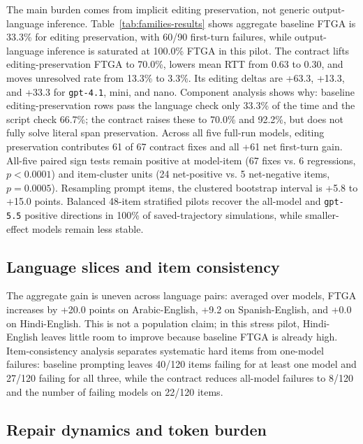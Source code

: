 The main burden comes from implicit editing preservation, not generic
output-language inference. Table~\ref{tab:families-results} shows aggregate
baseline FTGA is 33.3\% for editing preservation, with 60/90 first-turn
failures, while output-language inference is saturated at 100.0\% FTGA in this
pilot. The contract lifts editing-preservation FTGA to 70.0\%, lowers mean RTT
from 0.63 to 0.30, and moves unresolved rate from 13.3\% to 3.3\%. Its editing
deltas are +63.3, +13.3, and +33.3 for \texttt{gpt-4.1}, mini, and nano.
Component analysis shows why: baseline
editing-preservation rows pass the language check only 33.3\% of the time and
the script check 66.7\%; the contract raises these to 70.0\% and 92.2\%, but
does not fully solve literal span preservation. Across all five full-run models,
editing preservation contributes 61 of 67 contract fixes and all +61 net
first-turn gain. All-five paired sign tests remain positive at model-item
(67 fixes vs. 6 regressions, $p<0.0001$) and item-cluster units (24
net-positive vs. 5 net-negative items, $p=0.0005$). Resampling prompt items,
the clustered bootstrap interval is +5.8 to +15.0 points.
Balanced 48-item stratified pilots recover the all-model and \texttt{gpt-5.5}
positive directions in 100\% of saved-trajectory simulations, while
smaller-effect models remain less stable.

\subsection{Language slices and item consistency}

The aggregate gain is uneven across language pairs: averaged over models, FTGA
increases by +20.0 points on Arabic-English, +9.2 on Spanish-English, and +0.0
on Hindi-English. This is not a population claim; in this stress pilot,
Hindi-English leaves little room to improve because baseline FTGA is already
high. Item-consistency analysis separates systematic hard items from one-model
failures: baseline prompting leaves 40/120 items failing for at least one model
and 27/120 failing for all three, while the contract reduces all-model failures
to 8/120 and the number of failing models on 22/120 items.

\subsection{Repair dynamics and token burden}

